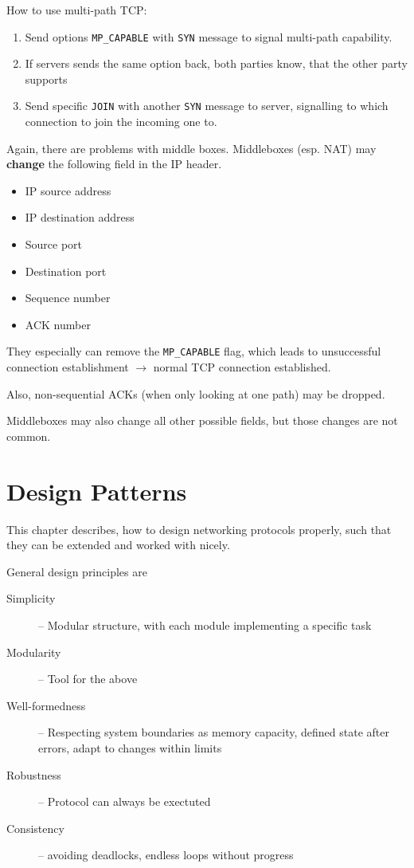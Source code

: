 \documentclass[english]{panikzettel}
\begin{document}
	How to use multi-path TCP:
	\begin{enumerate}
		\item Send options \texttt{MP\_CAPABLE} with \texttt{SYN} message to signal multi-path capability.
		\item If servers sends the same option back, both parties know, that the other party supports 
		\item Send specific \texttt{JOIN} with another \texttt{SYN} message to server, signalling to which connection to join the incoming one to.
	\end{enumerate}

	Again, there are problems with middle boxes.
	Middleboxes (esp. NAT) may \textbf{change} the following field in the IP header.
	\begin{itemize}
		\item IP source address
		\item IP destination address
		\item Source port
		\item Destination port
		\item Sequence number 
		\item ACK number
	\end{itemize}
	They especially can remove the \texttt{MP\_CAPABLE} flag, which leads to unsuccessful connection establishment \( \rightarrow \) normal TCP connection established.

	Also, non-sequential ACKs (when only looking at one path) may be dropped.
	
	Middleboxes may also change all other possible fields, but those changes are not common.
		
	\newpage
	\section{Design Patterns}
	\label{design-patterns}
	
	This chapter describes, how to design networking protocols properly, such that they can be extended and worked with nicely. 

	General design principles are
	\begin{description}
		\item[Simplicity] – Modular structure, with each module implementing a specific task
		\item[Modularity] – Tool for the above
		\item[Well-formedness] – Respecting system boundaries as memory capacity, defined state after errors, adapt to changes within limits
		\item[Robustness] – Protocol can always be exectuted
		\item[Consistency] – avoiding deadlocks, endless loops without progress
	\end{description}
\end{document}
